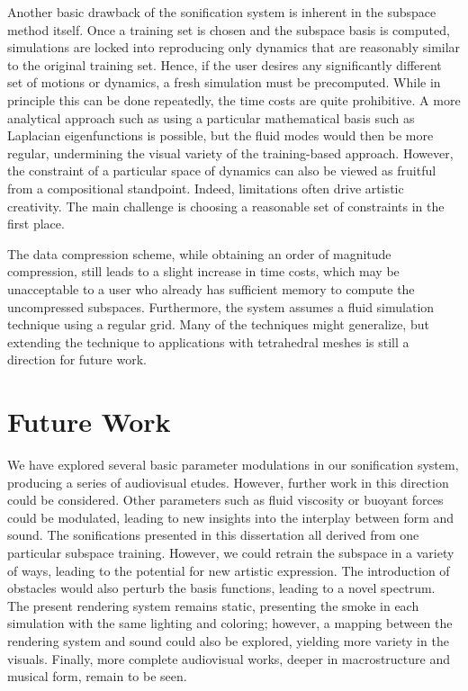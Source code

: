 Another basic drawback of the sonification system is inherent in the subspace method itself. Once a training set is chosen and the subspace basis is computed, simulations are locked into 
reproducing only dynamics that are reasonably similar to the original training set. Hence, if the user desires any significantly different set of motions or dynamics, a fresh simulation must be precomputed.
While in principle this can be done repeatedly, the time costs are quite prohibitive. A more analytical approach such as using a particular mathematical basis such as Laplacian eigenfunctions is possible,
but the fluid modes would then be more regular, undermining the visual variety of the training-based approach. However, the constraint of a particular space of dynamics can also be viewed as fruitful from
a compositional standpoint. Indeed, limitations often drive artistic creativity. The main challenge is choosing a reasonable set of constraints in the first place.

The data compression scheme, while obtaining an order of magnitude compression, still leads to a slight increase in time costs, which may be unacceptable to a user who already
has sufficient memory to compute the uncompressed subspaces. Furthermore, the system assumes a fluid simulation technique using a regular grid. Many of the techniques might 
generalize, but extending the technique to applications with tetrahedral meshes is still a direction for future work. 

\section{Future Work}
We have explored several basic parameter modulations in our sonification system, producing a series of audiovisual etudes. However, further work in this direction could be considered. Other
parameters such as fluid viscosity or buoyant forces could be modulated, leading to new insights into the interplay between form and sound. The sonifications presented
in this dissertation all derived from one particular subspace training. However, we could retrain the subspace in a variety of ways, leading to the potential for new artistic expression. The introduction
of obstacles would also perturb the basis functions, leading to a novel spectrum. The present rendering system remains static, presenting the smoke in each simulation
with the same lighting and coloring; however, a mapping between the rendering system and sound could also be explored, yielding more variety in the visuals. Finally, more complete audiovisual works,
deeper in macrostructure and musical form, remain to be seen. 


